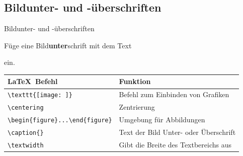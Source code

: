 \documentclass["WS\space 16-17\space -\space LaTeX-Kurs\space -\space Praesentation\space -\space 2.tex"]{subfiles}
\begin{document}
\subsection{Bildunter- und -überschriften}
\begin{frame}[c]
	\begin{center}
		\large Bildunter- und -überschriften
	\end{center}
\end{frame}
\begin{frame}[fragile]
	\begin{Aufgabe}
		Füge eine Bild\textbf{unter}schrift mit dem Text
		
		\textrm{}
		
		ein.
	\end{Aufgabe}

	\btVFill\Befehle
	\begin{center}
		\begin{tabular}{ll}
			\toprule
			\LaTeX\ Befehl								&	Funktion								\\ \midrule
			\lstinline|\texttt{[image: ]}|			&	Befehl zum Einbinden von Grafiken		\\ 
			\lstinline|\centering|						&	Zentrierung								\\
			\lstinline|\begin{figure}...\end{figure}|	&	Umgebung für Abbildungen				\\
			\lstinline|\caption{}|						&	Text der Bild Unter- oder Überschrift	\\
			\lstinline|\textwidth|						&	Gibt die Breite des Textbereichs aus	\\
			\bottomrule
		\end{tabular}
	\end{center}
	\vspace{0.1cm}
\end{frame}
\end{document}
